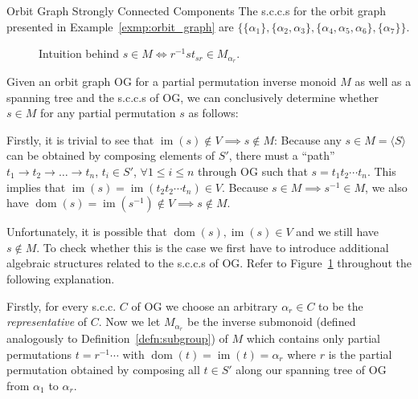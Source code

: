\begin{exmp}{Orbit Graph Strongly Connected Components}
  The s.c.c.s for the orbit graph presented in
  Example~\ref{exmp:orbit_graph} are $\{\{\alpha_1\},\{\alpha_2,\alpha_3\},
  \{\alpha_4,\alpha_5,\alpha_6\},\{\alpha_7\}\}$.
\end{exmp}

\begin{figure}
  \centering
  \caption{Intuition behind $s \in M \iff r^{-1} s t_{sr} \in M_{\alpha_r}$.}
  \label{fig:is_member_partial}
\end{figure}

\noindent
Given an orbit graph $\mathrm{OG}$ for a partial permutation inverse monoid $M$
as well as a spanning tree and the s.c.c.s of $\mathrm{OG}$, we can conclusively
determine whether $s \in M$ for any partial permutation $s$ as follows:

Firstly, it is trivial to see that $\operatorname{im}(s) \notin V \implies s
\notin M$: Because any $s \in M = \langle S \rangle$ can be obtained by
composing elements of $S'$, there must a ``path'' $t_1 \rightarrow t_2
\rightarrow \dots \rightarrow t_n$, $t_i \in S'$, $\forall 1 \leq i \leq n$
through $\mathrm{OG}$ such that $s = t_1 t_2 \cdots t_n$. This implies that
$\operatorname{im}(s) = \operatorname{im}(t_2 t_2 \cdots t_n) \in V$. Because
$s \in M \implies s^{-1} \in M$, we also have $\operatorname{dom}(s) =
\operatorname{im}(s^{-1}) \notin V \implies s \notin M$.

Unfortunately, it is possible that $\operatorname{dom}(s), \operatorname{im}(s)
\in V$ and we still have $s \notin M$. To check whether this is the case we
first have to introduce additional algebraic structures related to the s.c.c.s
of $\mathrm{OG}$. Refer to Figure~\ref{fig:is_member_partial} throughout the
following explanation.

Firstly, for every s.c.c. $C$ of $\mathrm{OG}$ we choose an arbitrary $\alpha_r
\in C$ to be the \textit{representative} of $C$.
%
Now we let $M_{\alpha_r}$ be the inverse submonoid (defined analogously to
Definition~\ref{defn:subgroup}) of $M$ which contains only partial permutations
$t = r^{-1} \cdots $ with $\operatorname{dom}(t) = \operatorname{im}(t) =
\alpha_r$ where $r$ is the partial permutation obtained by composing all $t \in
S'$ along our spanning tree of $\mathrm{OG}$ from $\alpha_1$ to $\alpha_r$.

